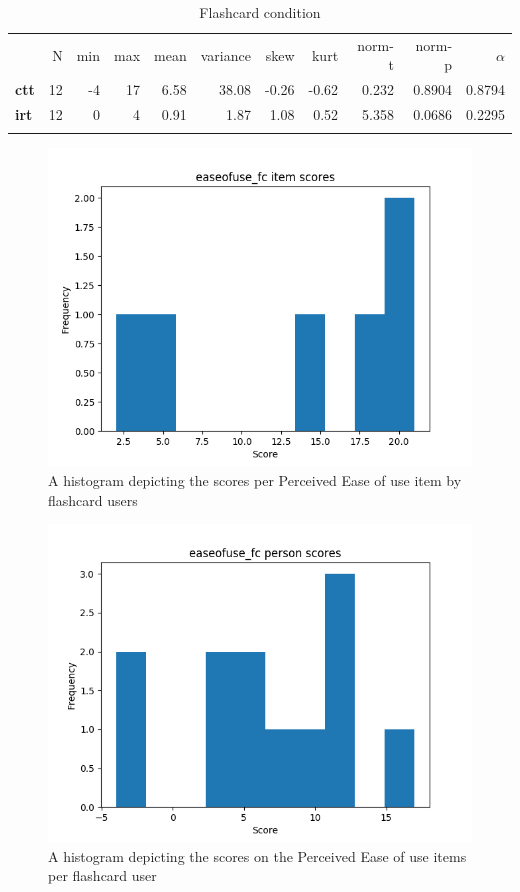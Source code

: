 \begin{longtable}[c]{@{}lrrrrrrrrrr@{}}
\caption{Flashcard condition}
\endfirsthead
\toprule\addlinespace
& N & min & max & mean & variance & skew & kurt & norm-t &
norm-p & $\alpha$
\\\addlinespace
\midrule
\textbf{ctt} & 12 & -4 & 17 & 6.58 & 38.08 & -0.26 & -0.62 & 0.232 &
0.8904 & 0.8794
\\\addlinespace
\textbf{irt} & 12 & 0 & 4 & 0.91 & 1.87 & 1.08 & 0.52 & 5.358 & 0.0686 &
0.2295
\\\addlinespace
\bottomrule
    \label{tab:easeofuse_fc}
\end{longtable}

\begin{figure}
    \includegraphics[width=\textwidth]{img/easeofuse_fc_diff.png}
    \caption{A histogram depicting the scores per Perceived Ease of use item by flashcard users}
    \label{fig:easeofuse_fc_diff}
\end{figure}
\begin{figure}
    \includegraphics[width=\textwidth]{img/easeofuse_fc_abil.png}
    \caption{A histogram depicting the scores on the Perceived Ease of use items per flashcard user}
    \label{fig:easeofuse_fc_abil}
\end{figure}


